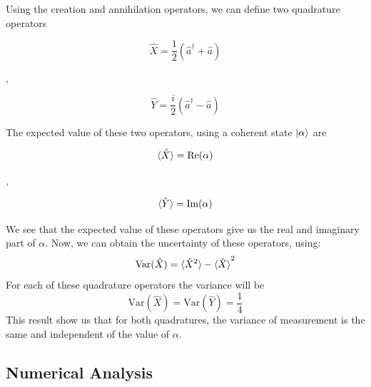 %
%
Using the creation and annihilation operators, we can define two quadrature operators
\cite{loudon2000}
%
\begin{center}
	\begin{minipage}{41mm}
		\noindent
		\begin{equation}
			\hat{X} = \frac{1}{2} \left( \hat{a}^\dagger + \hat{a} \right)
		\end{equation}
	\end{minipage}
	$,\quad$
	\begin{minipage}{40mm}
		\noindent
		\begin{equation}
			\hat{Y} = \frac{i}{2} \left( \hat{a}^\dagger - \hat{a} \right)
		\end{equation}
	\end{minipage}
\end{center}
%
The expected value of these two operators, using a coherent state $\ket{\alpha}$ are
%
\begin{center}
	\begin{minipage}{37mm}
		\noindent
		\begin{equation}
			\braket{\hat{X}} = \textrm{Re}(\alpha)
		\end{equation}
	\end{minipage}
	$,\quad$
	\begin{minipage}{37mm}
		\noindent
		\begin{equation}
			\braket{\hat{Y}} = \textrm{Im}(\alpha)
		\end{equation}
	\end{minipage}
\end{center}
%
We see that the expected value of these operators give us the real and imaginary part of $\alpha$. Now, we can obtain the uncertainty of these operators, using:
%
\begin{equation}
\textrm{Var}(\hat{X}) = \braket{\hat{X}^2} - \braket{\hat{X}}^2
\end{equation}
%
For each of these quadrature operators the variance will be
%
\begin{equation}
\textrm{Var}(\hat{X}) = \textrm{Var}(\hat{Y}) = \frac{1}{4}
\end{equation}
%
This result show us that for both quadratures, the variance of measurement is the same and independent of the value of $\alpha$.
%
%
%
%
\subsection{Numerical Analysis}
%
%
%
%
